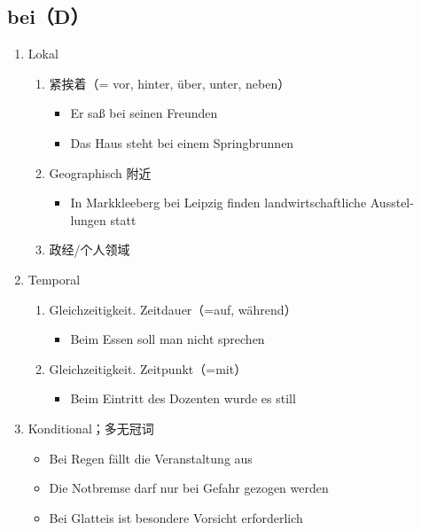 \documentclass[UTF8]{report}
\begin{document}
\subsection{bei（D）}
\begin{enumerate}
    \item Lokal
    \begin{enumerate}
        \item 紧挨着（= vor, hinter, über, unter, neben）
        \begin{itemize}
            \item Er saß bei seinen Freunden
            \item Das Haus steht bei einem Springbrunnen
        \end{itemize}
        \item Geographisch 附近
        \begin{itemize}
            \item In Markkleeberg bei Leipzig finden landwirtschaftliche Ausstel- lungen statt
        \end{itemize}
        \item 政经/个人领域
    \end{enumerate}
    \item Temporal
    \begin{enumerate}
        \item Gleichzeitigkeit. Zeitdauer（=auf, während）
        \begin{itemize}
            \item Beim Essen soll man nicht sprechen
        \end{itemize}
        \item Gleichzeitigkeit. Zeitpunkt（=mit）
        \begin{itemize}
            \item Beim Eintritt des Dozenten wurde es still
        \end{itemize}
    \end{enumerate}
    \item Konditional；多无冠词
    \begin{itemize}
        \item Bei Regen fällt die Veranstaltung aus
        \item Die Notbremse darf nur bei Gefahr gezogen werden
        \item Bei Glatteis ist besondere Vorsicht erforderlich
    \end{itemize}
\end{enumerate}
\end{document}
